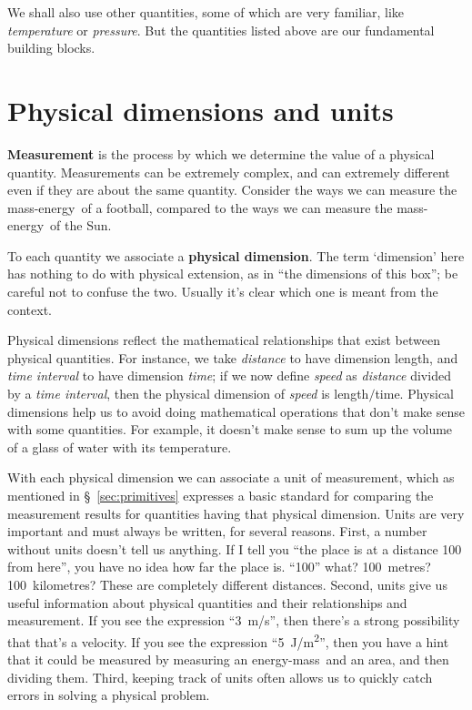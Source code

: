 \documentclass[a4paper,12pt,%
onecolumn,oneside,%
british%
]{memoir}
\renewcommand*{\|}[1][]{\nonscript\:#1\vert\nonscript\:\mathopen{}}
\newcommand*{\sect}{\S}%
\newcommand*{\energym}{energy-mass}
\newcommand*{\masse}{mass-energy}
\begin{document}
\medskip

We shall also use other quantities, some of which are very familiar, like \emph{temperature} or \emph{pressure}. But the quantities listed above are our fundamental building blocks.


 \section{Physical dimensions and units}
\label{sec:units}

\textbf{Measurement} is the process by which we determine the value of a physical quantity. Measurements can be extremely complex, and can extremely different even if they are about the same quantity. Consider the ways we can measure the \masse\ of a football, compared to the ways we can measure the \masse\ of the Sun.

To each quantity we associate a \textbf{physical dimension}. The term \enquote*{dimension} here has nothing to do with physical extension, as in \enquote{the dimensions of this box}; be careful not to confuse the two. Usually it's clear which one is meant from the context.

Physical dimensions reflect the mathematical relationships that exist between physical quantities. For instance, we take \emph{distance} to have dimension \textsf{length}, and \emph{time interval} to have dimension \emph{time}; if we now define \emph{speed} as \emph{distance} divided by a \emph{time interval}, then the physical dimension of \emph{speed} is \textsf{length}$/$\textsf{time}. Physical dimensions help us to avoid doing mathematical operations that don't make sense with some quantities. For example, it doesn't make sense to sum up the volume of a glass of water with its temperature.

\medskip

With each physical dimension we can associate a unit of measurement, which as mentioned in \sect~\ref{sec:primitives} expresses a basic standard for comparing the measurement results for quantities having that physical dimension. Units are very important and must always be written, for several reasons. First, a number without units doesn't tell us anything. If I tell you \enquote{the place is at a distance 100 from here}, you have no idea how far the place is. \enquote{100} what? 100~metres? 100~kilometres? These are completely different distances. Second, units give us useful information about physical quantities and their relationships and measurement. If you see the expression \enquote{\qty{3}{m/s}}, then there's a strong possibility that that's a velocity. If you see the expression \enquote{\qty{5}{J/m^2}}, then you have a hint that it could be measured by measuring an \energym\ and an area, and then dividing them. Third, keeping track of units often allows us to quickly catch errors in solving a physical problem.
\end{document}
